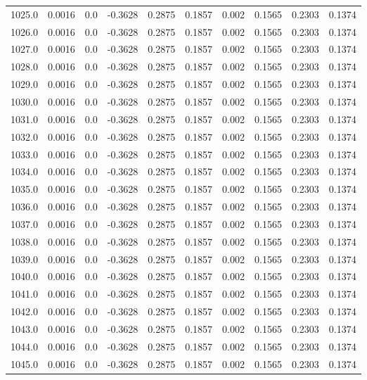 \begin{longtable}{lrrrrrrrrr}
1025.0 & 0.0016 & 0.0 & -0.3628 & 0.2875 & 0.1857 & 0.002 & 0.1565 & 0.2303 & 0.1374 \\
1026.0 & 0.0016 & 0.0 & -0.3628 & 0.2875 & 0.1857 & 0.002 & 0.1565 & 0.2303 & 0.1374 \\
1027.0 & 0.0016 & 0.0 & -0.3628 & 0.2875 & 0.1857 & 0.002 & 0.1565 & 0.2303 & 0.1374 \\
1028.0 & 0.0016 & 0.0 & -0.3628 & 0.2875 & 0.1857 & 0.002 & 0.1565 & 0.2303 & 0.1374 \\
1029.0 & 0.0016 & 0.0 & -0.3628 & 0.2875 & 0.1857 & 0.002 & 0.1565 & 0.2303 & 0.1374 \\
1030.0 & 0.0016 & 0.0 & -0.3628 & 0.2875 & 0.1857 & 0.002 & 0.1565 & 0.2303 & 0.1374 \\
1031.0 & 0.0016 & 0.0 & -0.3628 & 0.2875 & 0.1857 & 0.002 & 0.1565 & 0.2303 & 0.1374 \\
1032.0 & 0.0016 & 0.0 & -0.3628 & 0.2875 & 0.1857 & 0.002 & 0.1565 & 0.2303 & 0.1374 \\
1033.0 & 0.0016 & 0.0 & -0.3628 & 0.2875 & 0.1857 & 0.002 & 0.1565 & 0.2303 & 0.1374 \\
1034.0 & 0.0016 & 0.0 & -0.3628 & 0.2875 & 0.1857 & 0.002 & 0.1565 & 0.2303 & 0.1374 \\
1035.0 & 0.0016 & 0.0 & -0.3628 & 0.2875 & 0.1857 & 0.002 & 0.1565 & 0.2303 & 0.1374 \\
1036.0 & 0.0016 & 0.0 & -0.3628 & 0.2875 & 0.1857 & 0.002 & 0.1565 & 0.2303 & 0.1374 \\
1037.0 & 0.0016 & 0.0 & -0.3628 & 0.2875 & 0.1857 & 0.002 & 0.1565 & 0.2303 & 0.1374 \\
1038.0 & 0.0016 & 0.0 & -0.3628 & 0.2875 & 0.1857 & 0.002 & 0.1565 & 0.2303 & 0.1374 \\
1039.0 & 0.0016 & 0.0 & -0.3628 & 0.2875 & 0.1857 & 0.002 & 0.1565 & 0.2303 & 0.1374 \\
1040.0 & 0.0016 & 0.0 & -0.3628 & 0.2875 & 0.1857 & 0.002 & 0.1565 & 0.2303 & 0.1374 \\
1041.0 & 0.0016 & 0.0 & -0.3628 & 0.2875 & 0.1857 & 0.002 & 0.1565 & 0.2303 & 0.1374 \\
1042.0 & 0.0016 & 0.0 & -0.3628 & 0.2875 & 0.1857 & 0.002 & 0.1565 & 0.2303 & 0.1374 \\
1043.0 & 0.0016 & 0.0 & -0.3628 & 0.2875 & 0.1857 & 0.002 & 0.1565 & 0.2303 & 0.1374 \\
1044.0 & 0.0016 & 0.0 & -0.3628 & 0.2875 & 0.1857 & 0.002 & 0.1565 & 0.2303 & 0.1374 \\
1045.0 & 0.0016 & 0.0 & -0.3628 & 0.2875 & 0.1857 & 0.002 & 0.1565 & 0.2303 & 0.1374 \\

\end{longtable}

